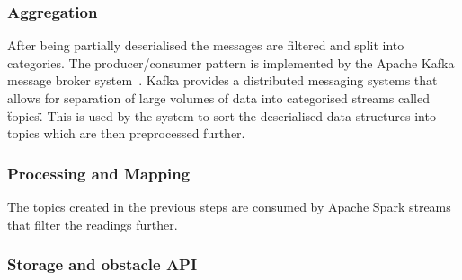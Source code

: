 \documentclass[prodmode,acmtosem]{acmsmall} %
\begin{document}
\subsubsection{Aggregation}
After being partially deserialised the messages are filtered and split into categories.
The producer/consumer pattern is implemented by the Apache Kafka message broker system~\cite{ApacheKafka}. Kafka provides a distributed messaging systems that allows for separation of large volumes of data into categorised streams called \"topics\". This is used by the system to sort the deserialised data structures into topics which are then preprocessed further.

\subsubsection{Processing and Mapping}
The topics created in the previous steps are consumed by Apache Spark streams that filter the readings further.

\subsubsection{Storage and obstacle API}





\end{document}
